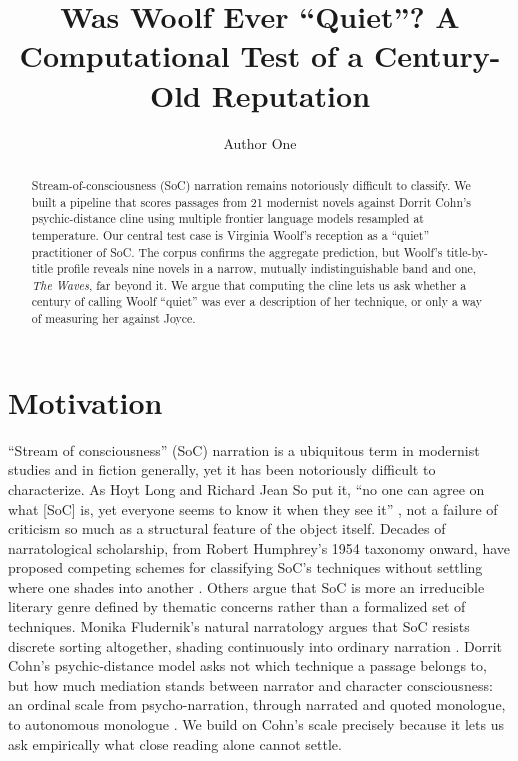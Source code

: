\documentclass{anthology-ch}         %
\title{Was Woolf Ever ``Quiet''? A Computational Test of a Century-Old Reputation}
\author[1]{Author One}[
  orcid=0000-0000-0000-0000
]
\affiliation{1}{TODO: Department, University, City, Country}
\begin{document}
\maketitle

\begin{abstract}
Stream-of-consciousness (SoC) narration remains notoriously difficult to
classify. We built a pipeline that scores passages from 21
modernist novels against Dorrit Cohn's psychic-distance cline using
multiple frontier language models resampled at temperature. Our central test
case is Virginia Woolf's reception as a ``quiet'' practitioner of SoC. The
corpus confirms the aggregate prediction, but Woolf's title-by-title profile
reveals nine novels in a narrow, mutually indistinguishable band and one,
\textit{The Waves}, far beyond it. We argue that computing the cline lets us
ask whether a century of calling Woolf ``quiet'' was ever a description of
her technique, or only a way of measuring her against Joyce.
\end{abstract}

\section{Motivation}

``Stream of consciousness'' (SoC) narration is a ubiquitous term in modernist
studies and in fiction generally, yet it has been notoriously difficult to
characterize. As Hoyt Long and Richard Jean So put it, ``no one can agree on
what [SoC] is, yet everyone seems to know it when they see it''
\cite{longso2016turbulentflow}, not a failure of criticism so much as a
structural feature of the object itself. Decades of narratological
scholarship, from Robert Humphrey's 1954 taxonomy onward,
have proposed competing schemes for classifying SoC's techniques without
settling where one shades into another \cite{humphrey1954stream}. Others argue
that SoC is more an irreducible literary genre defined by thematic concerns
rather than a formalized set of techniques. Monika
Fludernik's natural narratology argues that SoC resists discrete sorting
altogether, shading continuously into ordinary narration
\cite{fludernik1996towards}. Dorrit Cohn's psychic-distance model asks not
which technique a passage belongs to, but how much mediation stands between
narrator and character consciousness: an ordinal scale from psycho-narration,
through narrated and quoted monologue, to autonomous monologue
\cite{cohn1978transparent}. We build on Cohn's scale precisely because it lets
us ask empirically what close reading alone cannot settle.
\end{document}
